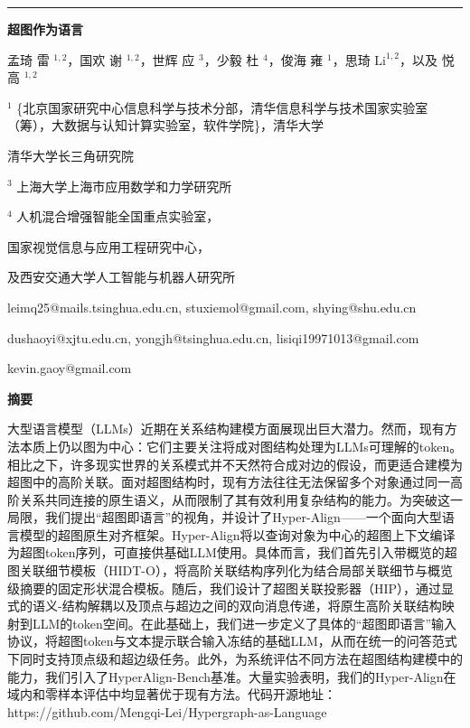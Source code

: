 \documentclass[10pt]{article}
\begin{document}
\vspace*{1em}
\noindent\hfill\rule{0.86\linewidth}{0.2mm}\hfill

\begin{center}
{\LARGE\bfseries 超图作为语言\par}
\vspace{1.5em}
孟琦 雷 \({}^{1,2}\)，国欢 谢 \({}^{1,2}\)，世辉 应 \({}^{3}\)，少毅 杜 \({}^{4}\)，俊海 雍 \({}^{1}\)，思琦 \({\mathrm{{Li}}}^{1,2}\)，以及 悦 高 \({}^{1,2}\)\par

\({}^{1}\) \{北京国家研究中心信息科学与技术分部，清华信息科学与技术国家实验室（筹），大数据与认知计算实验室，软件学院\}，清华大学\par

清华大学长三角研究院\par

\({}^{3}\) 上海大学上海市应用数学和力学研究所\par

\({}^{4}\) 人机混合增强智能全国重点实验室，\par

国家视觉信息与应用工程研究中心，\par

及西安交通大学人工智能与机器人研究所\par

leimq25@mails.tsinghua.edu.cn, stuxiemol@gmail.com, shying@shu.edu.cn\par

dushaoyi@xjtu.edu.cn, yongjh@tsinghua.edu.cn, lisiqi19971013@gmail.com\par

kevin.gaoy@gmail.com\par
\end{center}

\begin{center}
{\Large\bfseries 摘要\par}
\end{center}

大型语言模型（LLMs）近期在关系结构建模方面展现出巨大潜力。然而，现有方法本质上仍以图为中心：它们主要关注将成对图结构处理为LLMs可理解的token。相比之下，许多现实世界的关系模式并不天然符合成对边的假设，而更适合建模为超图中的高阶关联。面对超图结构时，现有方法往往无法保留多个对象通过同一高阶关系共同连接的原生语义，从而限制了其有效利用复杂结构的能力。为突破这一局限，我们提出“超图即语言”的视角，并设计了Hyper-Align——一个面向大型语言模型的超图原生对齐框架。Hyper-Align将以查询对象为中心的超图上下文编译为超图token序列，可直接供基础LLM使用。具体而言，我们首先引入带概览的超图关联细节模板（HIDT-O），将高阶关联结构序列化为结合局部关联细节与概览级摘要的固定形状混合模板。随后，我们设计了超图关联投影器（HIP），通过显式的语义-结构解耦以及顶点与超边之间的双向消息传递，将原生高阶关联结构映射到LLM的token空间。在此基础上，我们进一步定义了具体的“超图即语言”输入协议，将超图token与文本提示联合输入冻结的基础LLM，从而在统一的问答范式下同时支持顶点级和超边级任务。此外，为系统评估不同方法在超图结构建模中的能力，我们引入了HyperAlign-Bench基准。大量实验表明，我们的Hyper-Align在域内和零样本评估中均显著优于现有方法。代码开源地址：https://github.com/Mengqi-Lei/Hypergraph-as-Language
\end{document}
